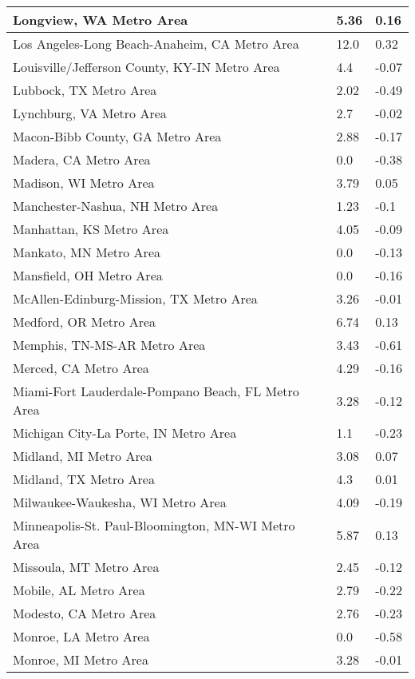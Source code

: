 \documentclass[12pt,oneside, letterpaper]{book}
\begin{document}
\begin{longtable}{| p{} | p{} | p{} |}
    Longview, WA Metro Area & 5.36 & 0.16 \\ \hline
    Los Angeles-Long Beach-Anaheim, CA Metro Area & 12.0 & 0.32 \\ \hline
    Louisville/Jefferson County, KY-IN Metro Area & 4.4 & -0.07 \\ \hline
    Lubbock, TX Metro Area & 2.02 & -0.49 \\ \hline
    Lynchburg, VA Metro Area & 2.7 & -0.02 \\ \hline
    Macon-Bibb County, GA Metro Area & 2.88 & -0.17 \\ \hline
    Madera, CA Metro Area & 0.0 & -0.38 \\ \hline
    Madison, WI Metro Area & 3.79 & 0.05 \\ \hline
    Manchester-Nashua, NH Metro Area & 1.23 & -0.1 \\ \hline
    Manhattan, KS Metro Area & 4.05 & -0.09 \\ \hline
    Mankato, MN Metro Area & 0.0 & -0.13 \\ \hline
    Mansfield, OH Metro Area & 0.0 & -0.16 \\ \hline
    McAllen-Edinburg-Mission, TX Metro Area & 3.26 & -0.01 \\ \hline
    Medford, OR Metro Area & 6.74 & 0.13 \\ \hline
    Memphis, TN-MS-AR Metro Area & 3.43 & -0.61 \\ \hline
    Merced, CA Metro Area & 4.29 & -0.16 \\ \hline
    Miami-Fort Lauderdale-Pompano Beach, FL Metro Area & 3.28 & -0.12 \\ \hline
    Michigan City-La Porte, IN Metro Area & 1.1 & -0.23 \\ \hline
    Midland, MI Metro Area & 3.08 & 0.07 \\ \hline
    Midland, TX Metro Area & 4.3 & 0.01 \\ \hline
    Milwaukee-Waukesha, WI Metro Area & 4.09 & -0.19 \\ \hline
    Minneapolis-St. Paul-Bloomington, MN-WI Metro Area & 5.87 & 0.13 \\ \hline
    Missoula, MT Metro Area & 2.45 & -0.12 \\ \hline
    Mobile, AL Metro Area & 2.79 & -0.22 \\ \hline
    Modesto, CA Metro Area & 2.76 & -0.23 \\ \hline
    Monroe, LA Metro Area & 0.0 & -0.58 \\ \hline
    Monroe, MI Metro Area & 3.28 & -0.01 \\ \hline

\end{longtable}
\end{document}
